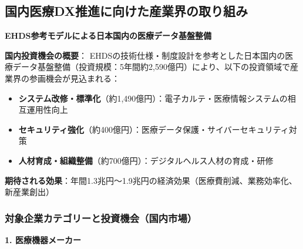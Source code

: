\documentclass[
  a4paper,
  a4paper,
  11pt]{ltjsbook}
\providecommand{\tightlist}{%
  \setlength{\itemsep}{0pt}\setlength{\parskip}{0pt}}
\begin{document}
\subsection{国内医療DX推進に向けた産業界の取り組み}\label{ux56fdux5185ux533bux7642dxux63a8ux9032ux306bux5411ux3051ux305fux7523ux696dux754cux306eux53d6ux308aux7d44ux307f}

\textbf{EHDS参考モデルによる日本国内の医療データ基盤整備}

\begin{tcolorbox}[enhanced jigsaw, toprule=.15mm, bottomtitle=1mm, coltitle=black, left=2mm, opacityback=0, arc=.35mm, colbacktitle=quarto-callout-note-color!10!white, colback=white, opacitybacktitle=0.6, bottomrule=.15mm, rightrule=.15mm, breakable, title=\textcolor{quarto-callout-note-color}{\faInfo}\hspace{0.5em}{Note}, toptitle=1mm, titlerule=0mm, colframe=quarto-callout-note-color-frame, leftrule=.75mm]

\textbf{国内投資機会の概要}：
EHDSの技術仕様・制度設計を参考とした日本国内の医療データ基盤整備（投資規模：5年間約2,590億円）により、以下の投資領域で産業界の参画機会が見込まれる：

\begin{itemize}
\tightlist
\item
  \textbf{システム改修・標準化}（約1,490億円）：電子カルテ・医療情報システムの相互運用性向上
\item
  \textbf{セキュリティ強化}（約400億円）：医療データ保護・サイバーセキュリティ対策
\item
  \textbf{人材育成・組織整備}（約700億円）：デジタルヘルス人材の育成・研修
\end{itemize}

\textbf{期待される効果}：年間1.3兆円〜1.9兆円の経済効果（医療費削減、業務効率化、新産業創出）

\end{tcolorbox}

\subsubsection{対象企業カテゴリーと投資機会（国内市場）}\label{ux5bfeux8c61ux4f01ux696dux30abux30c6ux30b4ux30eaux30fcux3068ux6295ux8cc7ux6a5fux4f1aux56fdux5185ux5e02ux5834}

\textbf{1. 医療機器メーカー}
\end{document}
